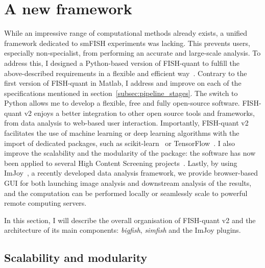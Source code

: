 \section{A new framework}
\label{sec:fqv2}

While an impressive range of computational methods already exists, a unified framework dedicated to \ac{smFISH} experiments was lacking.
This prevents users, especially non-specialist, from performing an accurate and large-scale analysis.
To address this, I designed a Python-based version of FISH-quant to fulfill the above-described requirements in a flexible and efficient way~\cite{Imbert_fq_2022}.
Contrary to the first version of FISH-quant in Matlab, I address and improve on each of the specifications mentioned in section~\ref{subsec:pipeline_stages}.
The switch to Python allows me to develop a flexible, free and fully open-source software.
FISH-quant v2 enjoys a better integration to other open source tools and frameworks, from data analysis to web-based user interaction.
Importantly, FISH-quant v2 facilitates the use of machine learning or deep learning algorithms with the import of dedicated packages, such as scikit-learn~\cite{scikit-learn} or TensorFlow~\cite{tensorflow_2015}.
I also improve the scalability and the modularity of the package: the software has now been applied to several High Content Screening projects~\cite{CHOUAIB_2020,safieddine_choreography_2021,pichon_kinesin_2021}.
Lastly, by using ImJoy~\cite{ouyang_imjoy_2019}, a recently developed data analysis framework, we provide browser-based \ac{GUI} for both launching image analysis and downstream analysis of the results, and the computation can be performed locally or seamlessly scale to powerful remote computing servers.

In this section, I will describe the overall organisation of FISH-quant v2 and the architecture of its main components: \emph{bigfish}, \emph{simfish} and the ImJoy plugins.

\subsection{Scalability and modularity}
\label{subsec:framework}

